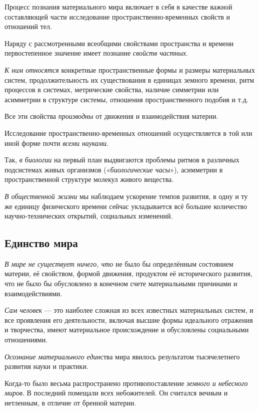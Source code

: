 \documentclass[a4paper,14pt,russian]{extreport}
\begin{document}
Процесс познания материального мира включает в себя в качестве важной составляющей части исследование пространственно-временных свойств и отношений тел.

Наряду с рассмотренными всеобщими свойствами пространства и времени первостепенное значение имеет познание \emph{свойств частных}.

\emph{К ним относятся} конкретные пространственные формы и размеры материальных систем, продолжительность их существования в единицах земного времени, ритм процессов в системах, метрические свойства, наличие симметрии или асимметрии в структуре системы, отношения пространственного подобия и т.д.

Все эти свойства \emph{производны} от движения и взаимодействия материи.

Исследование пространственно-временных отношений осуществляется в той или иной форме почти \emph{всеми науками}.

Так, \emph{в биологии} на первый план выдвигаются проблемы ритмов в различных подсистемах живых организмов («\emph{биологические часы}»), асимметрии в пространственной структуре молекул живого вещества.

\emph{В общественной жизни} мы наблюдаем ускорение темпов развития, в одну и ту же единицу физического времени сейчас укладывается всё большее количество научно-технических открытий, социальных изменений.

\subsection{Единство мира}

\emph{В мире не существует ничего, что} не было бы определённым состоянием материи, её свойством, формой движения, продуктом её исторического развития, что не было бы обусловлено в конечном счете материальными причинами и взаимодействиями.

\emph{Сам человек} --- это наиболее сложная из всех известных материальных систем, и все проявления его деятельности, включая высшие формы идеального отражения и творчества, имеют материальное происхождение и обусловлены социальными отношениями.

\emph{Осознание материального един}ства мира явилось результатом тысячелетнего развития науки и практики.

Когда-то было весьма распространено противопоставление \emph{земного и небесного миров}. В последний помещали всех небожителей. Он считался вечным и нетленным, в отличие от бренной материи.
\end{document}
